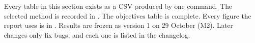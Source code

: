 \begin{done}
Every table in this section exists as a CSV produced by one command. The selected method is
recorded in . The objectives table is complete. Every figure the report uses
is in . Results are frozen as version 1 on 29 October (M2). Later changes
only fix bugs, and each one is listed in the changelog.
\end{done}
